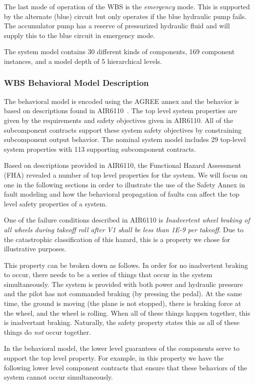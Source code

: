 The last mode of operation of the WBS is the \textit{emergency} mode. This is supported by the alternate (blue) circuit but only operates if the blue hydraulic pump fails. The accumulator pump has a reserve of pressurized hydraulic fluid and will supply this to the blue circuit in emergency mode.

The system model contains 30 different kinds of components, 169 component instances, and a model depth of 5 hierarchical levels. 

\subsubsection{WBS Behavioral Model Description}
The behavioral model is encoded using the AGREE annex and the behavior is based on descriptions found in AIR6110~\cite{AIR6110}. The top level system properties are given by the requirements and safety objectives given in AIR6110. All of the subcomponent contracts support these system safety objectives by constraining subcomponent output behavior. The nominal system model includes 29 top-level system properties with 113 supporting subcomponent contracts. 

Based on descriptions provided in AIR6110, the Functional Hazard Assessment (FHA) revealed a number of top level properties for the system. We will focus on one in the following sections in order to illustrate the use of the Safety Annex in fault modeling and how the behavioral propagation of faults can affect the top level safety properties of a system. 

One of the failure conditions described in AIR6110 is \textit{Inadvertent wheel braking of all wheels during takeoff roll after V1 shall be less than 1E-9 per takeoff}. Due to the catastrophic classification of this hazard, this is a property we chose for illustrative purposes. 

This property can be broken down as follows. In order for no inadvertent braking to occur, there needs to be a series of things that occur in the system simultaneously. The system is provided with both power and hydraulic pressure and the pilot has not commanded braking (by pressing the pedal). At the same time, the ground is moving (the plane is not stopped), there is braking force at the wheel, and the wheel is rolling. When all of these things happen together, this is inadvertant braking. Naturally, the safety property states this as all of these things do \textit{not} occur together. 

In the behavioral model, the lower level guarantees of the components serve to support the top level property. For example, in this property we have the following lower level component contracts that ensure that these behaviors of the system cannot occur simultaneously.














